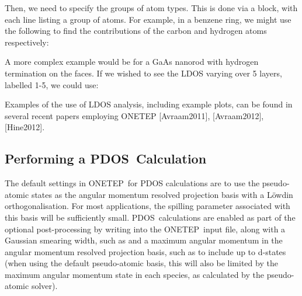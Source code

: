 \documentclass[letterpaper,10pt,english]{sphinxmanual}
\begin{document}
Then, we need to specify the groups of atom types. This is done via a
block, with each line listing a group of atoms. For example, in a
benzene ring, we might use the following to find the contributions of
the carbon and hydrogen atoms respectively:

%
\begin{sphinxVerbatim}[commandchars=\\\{\}]
 
 
\end{sphinxVerbatim}

A more complex example would be for a GaAs nanorod with hydrogen
termination on the faces. If we wished to see the LDOS varying over 5
layers, labelled 1-5, we could use:

%
\begin{sphinxVerbatim}[commandchars=\\\{\}]
 
    
    
    
    
    
 
\end{sphinxVerbatim}

Examples of the use of LDOS analysis, including example plots, can be
found in several recent papers employing ONETEP
{[}Avraam2011{]}, {[}Avraam2012{]}, {[}Hine2012{]}.


\subsection{Performing a PDOS Calculation}
\label{\detokenize{ldos_calculations:performing-a-pdos-calculation}}
The default settings in ONETEP for PDOS calculations are to use the
pseudo-atomic states as the angular momentum resolved projection basis
with a Löwdin orthogonalisation. For most applications, the spilling
parameter associated with this basis will be sufficiently small.
PDOS calculations are enabled as part of the optional post-processing by
writing  into the ONETEP input file, along with a
Gaussian smearing width, such as  and a maximum
angular momentum in the angular momentum resolved projection basis, such
as  to include up to d-states (when using the
default pseudo-atomic basis, this will also be limited by the maximum
angular momentum state in each species, as calculated by the
pseudo-atomic solver).
\end{document}
